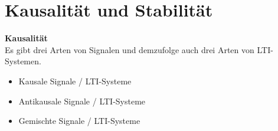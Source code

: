 \section{Kausalität und Stabilität}
	\textbf{Kausalität}\\[0.2cm]
	Es gibt drei Arten von Signalen und demzufolge auch drei Arten von LTI-Systemen.\\[-0.65cm]
	\begin{itemize}
	 \item Kausale Signale / LTI-Systeme\\[-0.65cm]
	 \item Antikausale Signale / LTI-Systeme\\[-0.65cm]
	 \item Gemischte Signale / LTI-Systeme
	\end{itemize}

